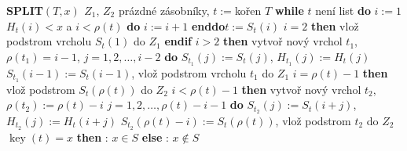 \documentclass[a4paper,12pt]{article}
\DeclareMathOperator*{\key}{key}
\begin{document}
{\bf SPLIT$(T,x)$\newline 
$Z_1$}, $Z_2$ prázdné zásobníky, $t:=$kořen $T$\newline 
{\bf while} $t$ není list {\bf do}\newline
\phantom{---}$i:=1$\newline 
\phantom{---}{\bf while} $H_t(i)<x$ a $i<\rho (t)$ {\bf do} $i:=i+1$ {\bf enddo}\newline \phantom{---}$t:=S_t(i)$\newline 
\phantom{---}{\bf if} $i=2$ {\bf then} vlož podstrom vrcholu $S_t(1)$ do $Z_1$ 
{\bf endif}\newline 
\phantom{---}{\bf if} $i>2$ {\bf then}\newline 
\phantom{------}vytvoř nový vrchol $t_1$, $\rho (t_1)=i-1$,\newline 
\phantom{------}{\bf for every} $j=1,2,\dots,i-2$ {\bf do}\newline 
\phantom{---------}$S_{t_1}(j):=S_t(j)$, $H_{t_1}(j):=H_t(j)$\newline 
\phantom{------}{\bf enddo}\newline 
\phantom{------}$S_{t_1}(i-1):=S_t(i-1)$, vlož podstrom vrcholu $t_1$ do $Z_1$\newline 
\phantom{---}{\bf endif}\newline 
\phantom{---}{\bf if} $i=\rho (t)-1$ {\bf then}\newline 
\phantom{------}vlož podstrom $S_t(\rho (t))$ do $Z_2$ 
\phantom{---}{\bf endif}\newline 
\phantom{---}{\bf if} $i<\rho (t)-1$ {\bf then}\newline 
\phantom{------}vytvoř nový vrchol $t_2$, $\rho (t_2):=\rho (t)-i$\newline 
\phantom{------}{\bf for every} $j=1,2,\dots,\rho (t)-i-1$ {\bf do}\newline 
\phantom{---------}$S_{t_2}(j):=S_t(i+j)$, $H_{t_2}(j):=H_t(i+j)$\newline 
\phantom{------}{\bf enddo}\newline 
\phantom{------}$S_{t_2}(\rho (t)-i):=S_t(\rho (t))$, vlož podstrom $t_2$ do $Z_2$ \newline 
\phantom{---}{\bf endif\newline 
enddo\newline 
if} $\key(t)=x$ {\bf then}\newline 
\phantom{---}{\bf Výstup}: $x\in S$\newline 
{\bf else}\newline 
\phantom{---}{\bf Výstup}: $x\notin S$\newline 
\end{document}
